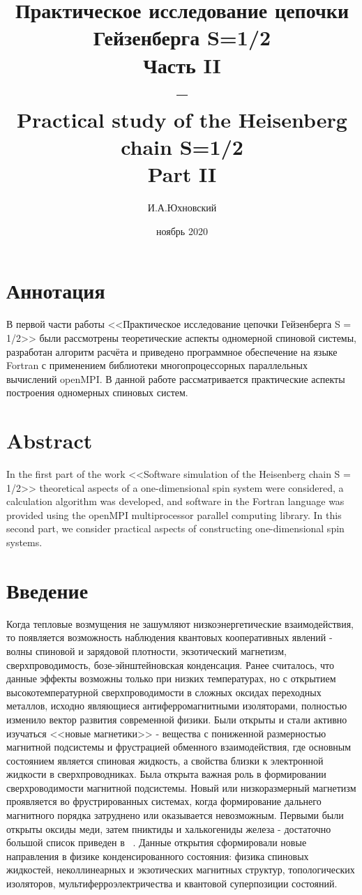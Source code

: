 \documentclass[11pt]{article}
\title{\textbf{Практическое исследование цепочки Гейзенберга S=1/2 \\ Часть II \\ -- \\ 
	Practical study of the Heisenberg chain S=1/2 \\ Part II}}
\author{И.А.Юхновский}
\date{ноябрь 2020}
\begin{document}
\maketitle
\thispagestyle{empty}
\section*{Аннотация}
В первой части работы <<Практическое исследование цепочки Гейзенберга S = 1/2>> были рассмотрены теоретические аспекты одномерной спиновой системы, разработан алгоритм расчёта и приведено программное обеспечение на языке Fortran с применением библиотеки многопроцессорных параллельных вычислений openMPI. В данной работе рассматривается практические аспекты построения одномерных спиновых систем.


\section*{Abstract}
In the first part of the work <<Software simulation of the Heisenberg chain S = 1/2>> theoretical aspects of a one-dimensional spin system were considered, a calculation algorithm was developed, and software in the Fortran language was provided using the openMPI multiprocessor parallel computing library. In this second part, we consider practical aspects of constructing one-dimensional spin systems.

\tableofcontents{}

\section{Введение}
Когда тепловые возмущения не зашумляют низкоэнергетические взаимодействия, то появляется возможность наблюдения квантовых кооперативных явлений - волны спиновой и зарядовой плотности, экзотический магнетизм, сверхпроводимость, бозе-эйнштейновская конденсация. Ранее считалось, что данные эффекты возможны только при низких температурах, но с открытием высокотемпературной сверхпроводимости в сложных оксидах переходных металлов, исходно являющиеся антиферромагнитными изоляторами, полностью изменило вектор развития современной физики. Были открыты и стали активно изучаться <<новые магнетики>> - вещества с пониженной размерностью магнитной подсистемы и фрустрацией обменного взаимодействия, где основным состоянием является спиновая жидкость, а свойства близки к электронной жидкости в сверхпроводниках. Была открыта важная роль в формировании сверхроводимости магнитной подсистемы. Новый или низкоразмерный магнетизм проявляется во фрустрированных системах, когда формирование дальнего магнитного порядка затруднено или оказывается невозможным. Первыми были открыты оксиды меди, затем пниктиды и халькогениды железа - достаточно большой список приведен в ~\cite{mp}. Данные открытия сформировали новые направления в физике конденсированного состояния: физика спиновых жидкостей, неколлинеарных и экзотических магнитных структур, топологических изоляторов, мультиферроэлектричества и квантовой суперпозиции состояний.
\end{document}
